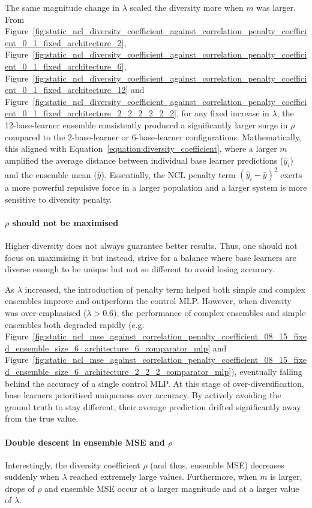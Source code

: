 The same magnitude change in $\lambda$ scaled the diversity more when $m$ was larger. From Figure~\ref{fig:static_ncl_diversity_coefficient_against_correlation_penalty_coefficient_0_1_fixed_architecture_2}, Figure~\ref{fig:static_ncl_diversity_coefficient_against_correlation_penalty_coefficient_0_1_fixed_architecture_6}, Figure~\ref{fig:static_ncl_diversity_coefficient_against_correlation_penalty_coefficient_0_1_fixed_architecture_12} and Figure~\ref{fig:static_ncl_diversity_coefficient_against_correlation_penalty_coefficient_0_1_fixed_architecture_2_2_2_2_2_2}, for any fixed increase in $\lambda$, the 12-base-learner ensemble consistently produced a significantly larger surge in $\rho$ compared to the 2-base-learner or 6-base-learner configurations. Mathematically, this aligned with Equation~\ref{equation:diversity_coefficient}, where a larger $m$ amplified the average distance between individual base learner predictions ($\hat{y}_i$) and the ensemble mean ($\bar{y}$). Essentially, the NCL penalty term $(\hat{y}_i - \bar{y})^2$ exerts a more powerful repulsive force in a larger population and a larger system is more sensitive to diversity penalty. 

\paragraph{$\rho$ should not be maximised}
Higher diversity does not always guarantee better results. Thus, one should not focus on maximising it but instead, strive for a balance where base learners are diverse enough to be unique but not so different to avoid losing accuracy. 

As $\lambda$ increased, the introduction of penalty term helped both simple and complex ensembles improve and outperform the control MLP. However, when diversity was over-emphasised ($\lambda > 0.6$), the performance of complex ensembles and simple ensembles both degraded rapidly (e.g. Figure~\ref{fig:static_ncl_mse_against_correlation_penalty_coefficient_08_15_fixed_ensemble_size_6_architecture_6_comparator_mlp} and Figure~\ref{fig:static_ncl_mse_against_correlation_penalty_coefficient_08_15_fixed_ensemble_size_6_architecture_2_2_2_comparator_mlp}), eventually falling behind the accuracy of a single control MLP. At this stage of over-diversification, base learners prioritised uniqueness over accuracy. By actively avoiding the ground truth to stay different, their average prediction drifted significantly away from the true value. 

\paragraph{Double descent in ensemble MSE and $\rho$}
Interestingly, the diversity coefficient $\rho$ (and thus, ensemble MSE) decreases suddenly when $\lambda$ reached extremely large values. Furthermore, when $m$ is larger, drops of $\rho$ and ensemble MSE occur at a larger magnitude and at a larger value of $\lambda$. 

